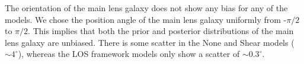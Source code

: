 The orientation of the main lens galaxy does not show any bias for any of the models. We chose the position angle of the main lens galaxy uniformly from -$\pi/2$ to $\pi/2$. This implies that both the prior and posterior distributions of the main lens galaxy are unbiased. There is some scatter in the None and Shear models ($\sim 4^\circ$), whereas the LOS framework models only show a scatter of $\sim 0.3^\circ$.
  